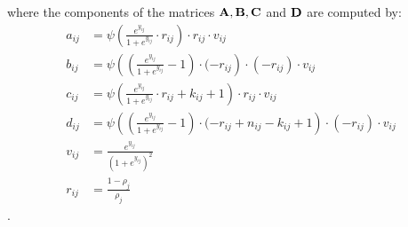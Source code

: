 where the components of the matrices $\mathbf{A}, \mathbf{B}, \mathbf{C}$ and $\mathbf{D}$ are computed by:
\begin{align*}
	a_{ij} &= \psi \left( \frac{ e^{y_{ij}} }{ 1+e^{y_{ij}} } \cdot r_{ij} \right) \cdot r_{ij} \cdot v_{ij}    \\
	b_{ij} &= \psi \left( \left (\frac{ e^{y_{ij}} }{ 1+e^{y_{ij}} } - 1 \right) \cdot (-r_{ij} \right) \cdot (-r_{ij}) \cdot v_{ij} \\
	c_{ij} &= \psi \left( \frac{ e^{y_{ij}} }{ 1+e^{y_{ij}} } \cdot r_{ij} + k_{ij} + 1 \right) \cdot r_{ij} \cdot v_{ij}    \\
	d_{ij} &= \psi \left( \left (\frac{ e^{y_{ij}} }{ 1+e^{y_{ij}} } - 1 \right) \cdot (-r_{ij} + n_{ij} - k_{ij} + 1 \right) \cdot (-r_{ij}) \cdot v_{ij} \\
	v_{ij} &= \frac{e^{y_{ij}}}{\left(1+e^{y_{ij}}\right)^2} \\
    r_{ij} &= \frac{1 - \rho_{j} }{ \rho_j }  
\end{align*}.

